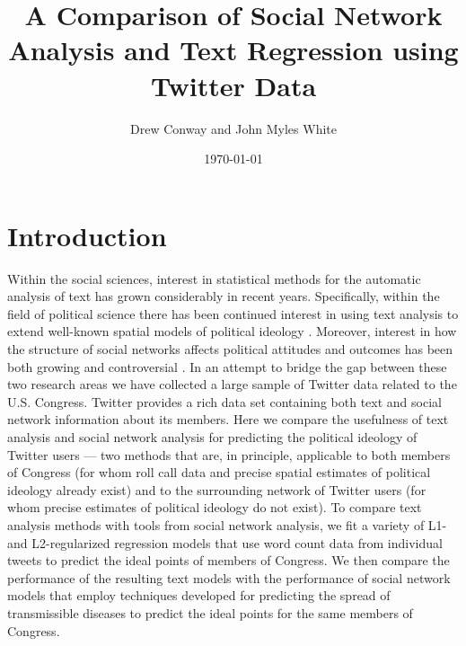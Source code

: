 \documentclass[10pt]{article}
\title{A Comparison of Social Network Analysis and Text Regression using Twitter Data}
\author{Drew Conway and John Myles White}
\date{\today}
\begin{document}
\maketitle

\section{Introduction}
Within the social sciences, interest in statistical methods for the automatic analysis of text has grown considerably in recent years.  Specifically, within the field of political science there has been continued interest in using text analysis to extend well-known spatial models of political ideology \citep{Grimmer_2011, Monroe_2008, Laver_2003}.  Moreover, interest in how the structure of social networks affects political attitudes and outcomes has been both growing \citep{Siegel_2009, Burton_2009} and controversial \citep{Fowler_2010, Lyons_2010}.  In an attempt to bridge the gap between these two research areas we have collected a large sample of Twitter data related to the U.S. Congress. Twitter provides a rich data set containing both text and social network information about its members. Here we compare the usefulness of text analysis and social network analysis for predicting the political ideology of Twitter users --- two methods that are, in principle, applicable to both members of Congress (for whom roll call data and precise spatial estimates of political ideology already exist) and to the surrounding network of Twitter users (for whom precise estimates of political ideology do not exist). To compare text analysis methods with tools from social network analysis, we fit a variety of L1- and L2-regularized regression models that use word count data from individual tweets to predict the ideal points of members of Congress. We then compare the performance of the resulting text models with the performance of social network models that employ techniques developed for predicting the spread of transmissible diseases to predict the ideal points for the same members of Congress.

\end{document}
